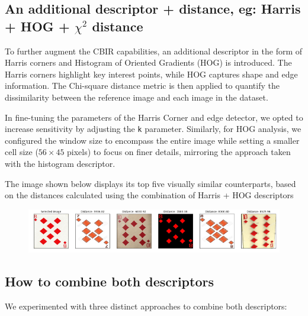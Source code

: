 \documentclass[12pt]{article}
\begin{document}
\subsection{An additional descriptor + distance, eg: Harris + HOG + $\chi^2$ distance}

To further augment the CBIR capabilities, an additional descriptor in the form of Harris corners and Histogram of Oriented Gradients (HOG) is introduced. The Harris corners highlight key interest points, while HOG captures shape and edge information. The Chi-square distance metric is then applied to quantify the dissimilarity between the reference image and each image in the dataset.

In fine-tuning the parameters of the Harris Corner and edge detector, we opted to increase sensitivity by adjusting the \texttt{k} parameter. Similarly, for HOG analysis, we configured the window size to encompass the entire image while setting a smaller cell size ($56 \times 45$ pixels) to focus on finer details, mirroring the approach taken with the histogram descriptor.

The image shown below displays its top five visually similar counterparts, based on the distances calculated using the combination of Harris + HOG descriptors

\begin{figure}[H]
    \centering
    \includegraphics[width=\textwidth]{imgs/hog_order.png}
\end{figure}

\subsection{How to combine both descriptors}

We experimented with three distinct approaches to combine both descriptors: 
\end{document}
